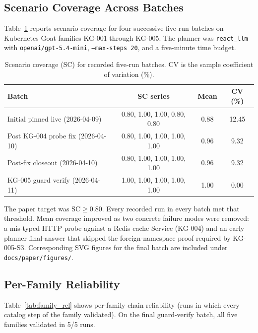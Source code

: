 \documentclass[conference]{IEEEtran}
\begin{document}
\subsection{Scenario Coverage Across Batches}

Table~\ref{tab:sc_batches} reports scenario coverage for four successive five-run batches on Kubernetes Goat families KG-001 through KG-005. The planner was \texttt{react\_llm} with \texttt{openai/gpt-5.4-mini}, \texttt{--max-steps 20}, and a five-minute time budget.

\begin{table}[t]
\centering
\caption{Scenario coverage (SC) for recorded five-run batches. CV is the sample coefficient of variation (\%).}
\label{tab:sc_batches}
\scriptsize
\begin{tabular}{lccc}
\toprule
\textbf{Batch} & \textbf{SC series} & \textbf{Mean} & \textbf{CV (\%)} \\
\midrule
Initial pinned live (2026-04-09) & 0.80, 1.00, 1.00, 0.80, 0.80 & 0.88 & 12.45 \\
Post KG-004 probe fix (2026-04-10) & 0.80, 1.00, 1.00, 1.00, 1.00 & 0.96 & 9.32 \\
Post-fix closeout (2026-04-10) & 0.80, 1.00, 1.00, 1.00, 1.00 & 0.96 & 9.32 \\
KG-005 guard verify (2026-04-11) & 1.00, 1.00, 1.00, 1.00, 1.00 & 1.00 & 0.00 \\
\bottomrule
\end{tabular}
\end{table}

The paper target was $\mathrm{SC}\geq 0.80$. Every recorded run in every batch met that threshold. Mean coverage improved as two concrete failure modes were removed: a mis-typed HTTP probe against a Redis cache Service (KG-004) and an early planner final-answer that skipped the foreign-namespace proof required by KG-005-S3. Corresponding SVG figures for the final batch are included under \texttt{docs/paper/figures/}.

\subsection{Per-Family Reliability}

Table~\ref{tab:family_rel} shows per-family chain reliability (runs in which every catalog step of the family validated). On the final guard-verify batch, all five families validated in 5/5 runs.
\end{document}
